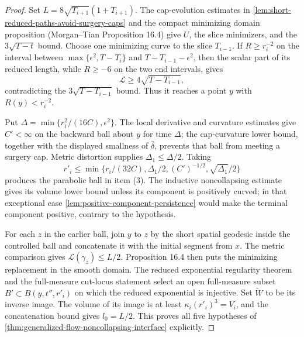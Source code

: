 \begin{proof}
Set $L=8\sqrt{T_{i+1}}(1+T_{i+1})$.  The cap-evolution estimates in
\ref{lem:short-reduced-paths-avoid-surgery-caps} and the compact minimizing
domain proposition (Morgan--Tian Proposition 16.4) give $U$, the slice
minimizers, and the $3\sqrt{T-t}$ bound.  Choose one minimizing curve to the
slice $T_{i-1}$.  If $R\ge r_i^{-2}$ on the interval between
$\max\{\epsilon^2,T-T_i\}$ and $T-T_{i-1}-\epsilon^2$, then the scalar part of
its reduced length, while $R\ge-6$ on the two end intervals, gives
\[
 \mathcal L\ge4\sqrt{T-T_{i-1}},
\]
contradicting the $3\sqrt{T-T_{i-1}}$ bound.  Thus it reaches a point
$y$ with $R(y)<r_i^{-2}$.

Put $\Delta=\min\{r_i^2/(16C),\epsilon^2\}$.  The local derivative and
curvature estimates give $C'<\infty$ on the backward ball about $y$ for time
$\Delta$; the cap-curvature lower bound, together with the displayed smallness
of $\bar\delta$, prevents that ball from meeting a surgery cap.  Metric
distortion supplies $\Delta_1\le\Delta/2$.  Taking
\[
 r'_i\le\min\{r_i/(32C),\Delta_1/2,(C')^{-1/2},\sqrt{\Delta_1}/2\}
\]
produces the parabolic ball in item (3).  The inductive noncollapsing estimate
gives its volume lower bound unless its component is positively curved; in
that exceptional case \ref{lem:positive-component-persistence} would make the
terminal component positive, contrary to the hypothesis.

For each $z$ in the earlier ball, join $y$ to $z$ by the short spatial geodesic
inside the controlled ball and concatenate it with the initial segment from
$x$.  The metric comparison gives $\mathcal L(\gamma_z)\le L/2$.
Proposition 16.4 then puts the minimizing replacement in the smooth domain.
The reduced exponential regularity theorem and the full-measure cut-locus
statement select an open full-measure subset
$B'\subset B(y,t'',r'_i)$ on which the reduced exponential is injective.  Set
$\widetilde W$ to be its inverse image.  The volume of its image is at least
$\kappa_i(r'_i)^3=V_i$, and the concatenation bound gives $l_0=L/2$.
This proves all five hypotheses of
\ref{thm:generalized-flow-noncollapsing-interface} explicitly.
\end{proof}

